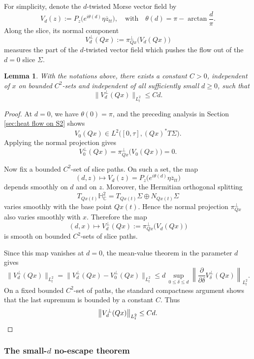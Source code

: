 \documentclass[11pt]{amsart}
\theoremstyle{plain}
\newtheorem{lem}[thm]{Lemma}
\theoremstyle{definition}
\newcommand{\C}{\mathbb{C}}
\newcommand{\HH}{\mathbb{H}}
\begin{document}
For simplicity, denote the $d$-twisted Morse vector field by
\[
V_d(z):=P_z\bigl(e^{i\theta(d)}\eta \overline{z}_{tt}\bigr),\quad\text{with}\quad \theta(d)=\pi-\arctan\frac d\pi.
\]
Along the slice, its
normal component 
\[
V_d^\perp(Qx):=\pi_{Qx}^{\perp}\bigl(V_d(Qx)\bigr)
\]
measures the part of the $d$-twisted vector field which pushes the flow out of the $d=0$ slice $\Sigma$.

\begin{lem}\label{lem:order-d-almost-tangent}
With the notations above, there exists a constant $C>0$, independent of $x$ on bounded $C^2$-sets
and independent of all sufficiently small $d\ge 0$, such that
\[
\bigl\|V_d^\perp(Qx)\bigr\|_{L_t^2}\le Cd .
\]
\end{lem}

\begin{proof}
At $d=0$, we have $\theta(0)=\pi$, and  the preceding analysis in Section \ref{sec:heat flow on S2} shows
\[
V_0(Qx)\in L^2\bigl([0,\tau],(Qx)^*T\Sigma\bigr).
\]
Applying the normal projection gives
\[
V_0^\perp(Qx)=
\pi_{Qx}^{\perp}\bigl(V_0(Qx)\bigr)=0.
\]

Now fix a bounded $C^2$-set of slice paths. On such a set, the map
\[
(d,z)\longmapsto V_d(z)
=P_z\bigl(e^{i\theta(d)}\eta\overline{z}_{tt}\bigr)
\]
depends smoothly on $d$ and on $z$. Moreover, the Hermitian orthogonal splitting
\[
T_{Qx(t)}\HH^2_{\C}=T_{Qx(t)}\Sigma
\oplus N_{Qx(t)}\Sigma
\]
varies smoothly with the base point $Qx(t)$. Hence the normal projection
$\pi_{Qx}^{\perp}$ also varies smoothly with $x$. Therefore the map
\[
(d,x)\longmapsto V_d^\perp(Qx)
:=\pi_{Qx}^{\perp}\bigl(V_d(Qx)\bigr)
\]
is smooth on bounded $C^2$-sets of slice paths.

Since this map vanishes 
at $d=0$, the mean-value theorem in the
parameter $d$ gives
\[
\bigl\|V_d^\perp(Qx)\bigr\|_{L_t^2}=
\bigl\|V_d^\perp(Qx)-V_0^\perp(Qx)\bigr\|_{L_t^2} 
\le d\,\sup_{0\le \delta\le d}\left\|\frac{\partial}{\partial \delta}V_\delta^\perp(Qx)\right\|_{L_t^2}.
\]
On a fixed bounded $C^2$-set of paths, the standard compactness argument
shows that the last supremum is bounded by a constant $C$. Thus
\[
\bigl\|V_d^\perp(Qx)\bigr\|_{L_t^2}\le Cd. \qedhere
\]
\end{proof}





\subsubsection{The small-$d$ no-escape theorem}
\end{document}
